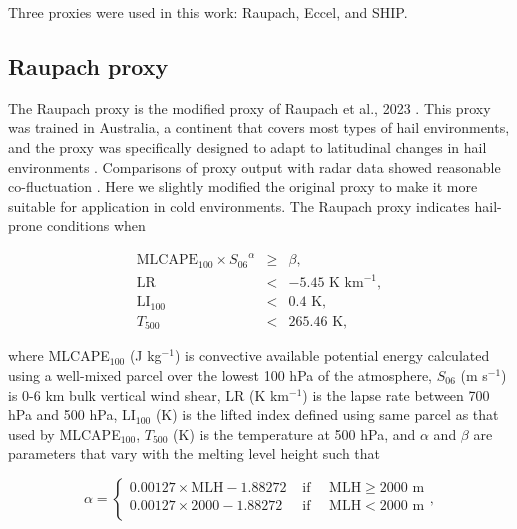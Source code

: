 \documentclass[pdflatex, sn-nature]{sn-jnl}\usepackage[]{graphicx}\usepackage[]{xcolor}
\begin{document}
Three proxies were used in this work: Raupach, Eccel, and SHIP.

\subsection{Raupach proxy}
\label{sec:raupach_proxy}

The Raupach proxy is the modified proxy of Raupach et al., 2023
\cite{Raupach_MWR_2023}. This proxy was trained in Australia, a continent that
covers most types of hail environments, and the proxy was specifically designed
to adapt to latitudinal changes in hail environments \citep{Raupach_MWR_2023}.
Comparisons of proxy output with radar data showed reasonable co-fluctuation
\citep{Raupach_npjCAS_2023}. Here we slightly modified the original proxy to
make it more suitable for application in cold environments. The Raupach proxy
indicates hail-prone conditions when

\begin{eqnarray}
    \textrm{MLCAPE}_{100} \times {S_{06}}^\alpha & \geq & \beta, \label{eq:discrim} \\
    \textrm{LR} & < & -5.45 \textrm{ K km}^{-1} \label{eq:extra_conditions_1}, \\
    \textrm{LI}_{100} & < & 0.4 \textrm{ K} \label{eq:extra_conditions_2}, \\
    T_{500} & < & 265.46 \textrm{ K} \label{eq:extra_conditions_3},
\end{eqnarray}

where MLCAPE$_{100}$ (J kg$^{-1}$) is convective available potential energy
calculated using a well-mixed parcel over the lowest 100 hPa of the atmosphere,
$S_{06}$ (m s$^{-1}$) is 0-6 km bulk vertical wind shear, LR (K km$^{-1}$) is
the lapse rate between 700 hPa and 500 hPa, LI$_{100}$ (K) is the lifted index
\citep{Galway_BAMS_1956} defined using same parcel as that used by
MLCAPE$_{100}$, $T_{500}$ (K) is the temperature at 500 hPa, and $\alpha$ and
$\beta$ are parameters that vary with the melting level height such that

\begin{equation}
\alpha = 
    \begin{cases} 
        0.00127 \times \textrm{MLH} - 1.88272 & \textrm{ if }\quad\textrm{MLH} \geq 2000 \textrm{ m} \\
        0.00127 \times 2000 - 1.88272 & \textrm{ if }\quad\textrm{MLH} < 2000 \textrm{ m}\\
    \end{cases},
    \label{eq:newalpha}
\end{equation}
\end{document}
